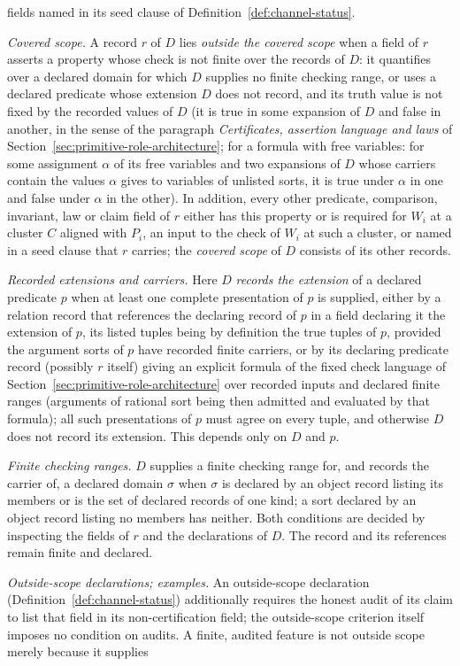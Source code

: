 \documentclass[11pt]{article}
\theoremstyle{definition}
\begin{document}
fields named in its seed clause of Definition~\ref{def:channel-status}. \par\noindent\emph{Covered scope.} A record \(r\) of \(D\) lies \emph{outside the covered scope} when a field of \(r\) asserts a property whose check is not finite over the records of \(D\): it quantifies over a declared domain for which \(D\) supplies no finite checking range, or uses a declared predicate whose extension \(D\) does not record, and its truth value is not fixed by the recorded values of \(D\) (it is true in some expansion of \(D\) and false in another, in the sense of the paragraph \emph{Certificates, assertion language and laws} of Section~\ref{sec:primitive-role-architecture}; for a formula with free variables: for some assignment \(\alpha\) of its free variables and two expansions of \(D\) whose carriers contain the values \(\alpha\) gives to variables of unlisted sorts, it is true under \(\alpha\) in one and false under \(\alpha\) in the other). In addition, every other predicate, comparison, invariant, law or claim field of \(r\) either has this property or is required for \(W_i\) at a cluster \(C\) aligned with \(P_i\), an input to the check of \(W_i\) at such a cluster, or named in a seed clause that \(r\) carries; the \emph{covered scope} of \(D\) consists of its other records. \par\noindent\emph{Recorded extensions and carriers.} Here \(D\) \emph{records the extension} of a declared predicate \(p\) when at least one complete presentation of \(p\) is supplied, either by a relation record that references the declaring record of \(p\) in a field declaring it the extension of \(p\), its listed tuples being by definition the true tuples of \(p\), provided the argument sorts of \(p\) have recorded finite carriers, or by its declaring predicate record (possibly \(r\) itself) giving an explicit formula of the fixed check language of Section~\ref{sec:primitive-role-architecture} over recorded inputs and declared finite ranges (arguments of rational sort being then admitted and evaluated by that formula); all such presentations of \(p\) must agree on every tuple, and otherwise \(D\) does not record its extension. This depends only on \(D\) and \(p\).\par\noindent\emph{Finite checking ranges.} \(D\) supplies a finite
checking range for, and records the carrier of, a declared domain \(\sigma\)
when \(\sigma\) is declared by an object record listing its members or is the
set of declared records of one kind; a sort declared by an object record
listing no members has neither. Both conditions are decided by inspecting the fields of \(r\) and the declarations of \(D\). The record and its references remain finite and declared. \par\noindent\emph{Outside-scope declarations; examples.} An outside-scope declaration (Definition~\ref{def:channel-status}) additionally requires the honest audit of its claim to list that field in its non-certification field; the outside-scope criterion itself imposes no condition on audits. A finite, audited feature is not outside scope merely because it supplies
\end{document}
